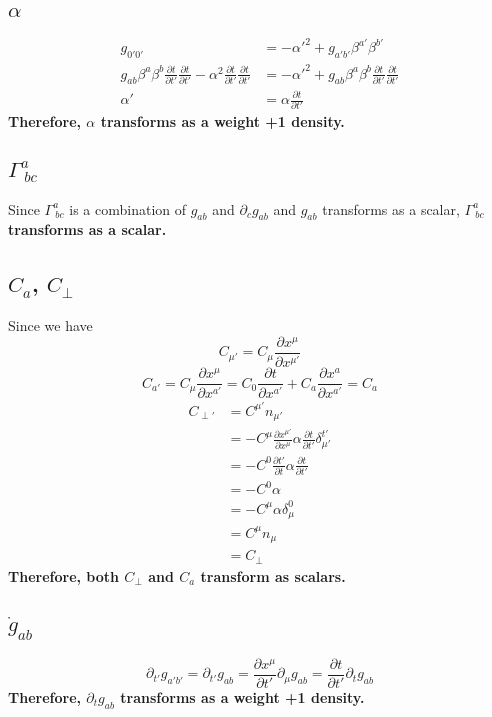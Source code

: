 \documentclass{article}
\begin{document}
\subsection{$\alpha$}
\begin{align*}
g_{0'0'} & = -\alpha'^2 + g_{a'b'}\beta^{a'}\beta^{b'}\\
g_{ab}\beta^{a}\beta^{b}\frac{\partial t}{\partial t'}\frac{\partial t}{\partial t'} - \alpha^2\frac{\partial t}{\partial t'}\frac{\partial t}{\partial t'} & =  -\alpha'^2 + g_{ab}\beta^{a}\beta^{b}\frac{\partial t}{\partial t'}\frac{\partial t}{\partial t'}\\
\alpha' & = \alpha\frac{\partial t}{\partial t'}
\end{align*}
{\bf {\color{red}Therefore, $\alpha$ transforms as a weight +1 density.}}
\subsection{$\Gamma^{a}_{~bc}$}
Since $\Gamma^{a}_{~bc}$ is a combination of $g_{ab}$ and $\partial_{c}g_{ab}$ and $g_{ab}$ transforms as a scalar, {\bf {\color{red}$\Gamma^{a}_{~bc}$ transforms as a scalar.}}
\subsection{$C_{a}$, $C_{\perp}$}
Since we have
\[
C_{\mu'} = C_{\mu}\frac{\partial x^{\mu}}{\partial x^{\mu'}}
\]
\[
\boxed{
C_{a'} = C_{\mu}\frac{\partial x^{\mu}}{\partial x^{a'}} = C_{0}\frac{\partial t}{\partial x^{a'}} + C_{a}\frac{\partial x^{a}}{\partial x^{a'}} = C_{a}
}
\]
\begin{align*}
C_{\perp'} & = C^{\mu'}n_{\mu'}\\
& = -C^{\mu}\frac{\partial x^{\mu'}}{\partial x^{\mu}}\alpha \frac{\partial t}{\partial t'}\delta^{t'}_{\mu'}\\
& = -C^{0}\frac{\partial t'}{\partial t}\alpha\frac{\partial t}{\partial t'}\\
& = -C^{0}\alpha\\
& = -C^{\mu}\alpha\delta^{0}_{\mu}\\
& = C^{\mu}n_{\mu}\\
& = C_{\perp}
\end{align*}
{\bf{\color{red}Therefore, both $C_{\perp}$ and $C_{a}$ transform as scalars. }}
\subsection{${\dot g}_{ab}$}
\[
\partial_{t'}g_{a'b'} = \partial_{t'}g_{ab} = \frac{\partial x^{\mu}}{\partial t'}\partial_{\mu}g_{ab} = \frac{\partial t}{\partial t'}\partial_{t}g_{ab}
\] 
{\bf {\color{red}Therefore, $\partial_{t}g_{ab}$ transforms as a weight +1 density.}}
\end{document}
